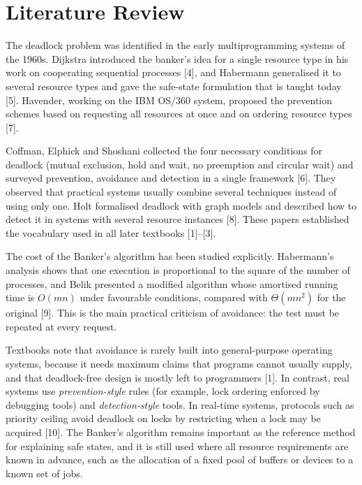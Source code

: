 \documentclass[11pt,a4paper]{report}
\begin{document}
\section{Literature Review}
The deadlock problem was identified in the early multiprogramming systems of the 1960s. Dijkstra introduced the banker's idea for a single resource type in his work on cooperating sequential processes [4], and Habermann generalised it to several resource types and gave the safe-state formulation that is taught today [5]. Havender, working on the IBM OS/360 system, proposed the prevention schemes based on requesting all resources at once and on ordering resource types [7].

Coffman, Elphick and Shoshani collected the four necessary conditions for deadlock (mutual exclusion, hold and wait, no preemption and circular wait) and surveyed prevention, avoidance and detection in a single framework [6]. They observed that practical systems usually combine several techniques instead of using only one. Holt formalised deadlock with graph models and described how to detect it in systems with several resource instances [8]. These papers established the vocabulary used in all later textbooks [1]--[3].

The cost of the Banker's algorithm has been studied explicitly. Habermann's analysis shows that one execution is proportional to the square of the number of processes, and Belik presented a modified algorithm whose amortised running time is $O(mn)$ under favourable conditions, compared with $\Theta(mn^2)$ for the original [9]. This is the main practical criticism of avoidance: the test must be repeated at every request.

Textbooks note that avoidance is rarely built into general-purpose operating systems, because it needs maximum claims that programs cannot usually supply, and that deadlock-free design is mostly left to programmers [1]. In contrast, real systems use \emph{prevention-style} rules (for example, lock ordering enforced by debugging tools) and \emph{detection-style} tools. In real-time systems, protocols such as priority ceiling avoid deadlock on locks by restricting when a lock may be acquired [10]. The Banker's algorithm remains important as the reference method for explaining safe states, and it is still used where all resource requirements are known in advance, such as the allocation of a fixed pool of buffers or devices to a known set of jobs.
\end{document}
